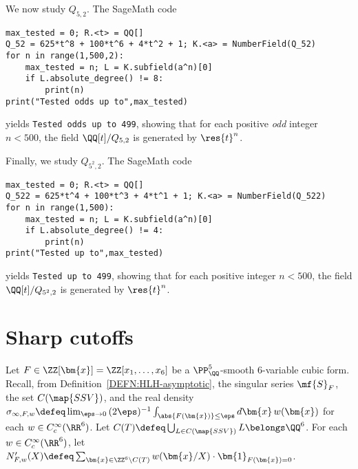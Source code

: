\documentclass[12pt]{report}
\begin{document}
We now study $Q_{5,2}$.
The SageMath code
\begin{verbatim}
max_tested = 0; R.<t> = QQ[]
Q_52 = 625*t^8 + 100*t^6 + 4*t^2 + 1; K.<a> = NumberField(Q_52)
for n in range(1,500,2):
    max_tested = n; L = K.subfield(a^n)[0]
    if L.absolute_degree() != 8:
        print(n)
print("Tested odds up to",max_tested)
\end{verbatim}
yields
\verb!Tested odds up to 499!,
showing that for each positive \emph{odd} integer $n<500$,
the field $\QQ[t]/Q_{5,2}$ is generated by $\res{t}^n$.


Finally,
we study $Q_{5^2,2}$.
The SageMath code
\begin{verbatim}
max_tested = 0; R.<t> = QQ[]
Q_522 = 625*t^4 + 100*t^3 + 4*t^1 + 1; K.<a> = NumberField(Q_522)
for n in range(1,500):
    max_tested = n; L = K.subfield(a^n)[0]
    if L.absolute_degree() != 4:
        print(n)
print("Tested up to",max_tested)
\end{verbatim}
yields
\verb!Tested up to 499!,
showing that for each positive integer $n<500$,
the field $\QQ[t]/Q_{5^2,2}$ is generated by $\res{t}^n$.




\chapter{Sharp cutoffs}
\label{CHAP:sharp-cutoffs}

Let $F\in \ZZ[\bm{x}]=\ZZ[x_1,\dots,x_6]$ be a $\PP^5_\QQ$-smooth $6$-variable cubic form.
Recall, from Definition~\ref{DEFN:HLH-asymptotic},
the singular series $\mf{S}_F$,
the set $C(\map{SSV})$,
and the real density $\sigma_{\infty,F,w}\defeq \lim_{\eps\to0} \,(2\eps)^{-1}\int_{\abs{F(\bm{x})}\leq\eps}d\bm{x}\,w(\bm{x})$ for each $w\in C^\infty_c(\RR^6)$.
Let $C(T)\defeq \bigcup_{L\in C(\map{SSV})} L\belongs \QQ^6$.
For each $w\in C^\infty_c(\RR^6)$, let $N'_{F,w}(X)\defeq \sum_{\bm{x}\in \ZZ^6\setminus C(T)} w(\bm{x}/X)\cdot \bm{1}_{F(\bm{x})=0}$.
\end{document}
